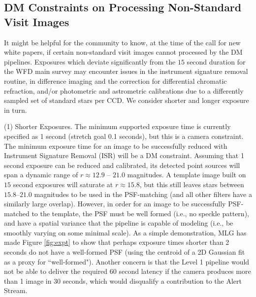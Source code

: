 \documentclass[DM,lsstdraft,toc]{lsstdoc}
\begin{document}
\subsection{DM Constraints on Processing Non-Standard Visit Images}\label{ssec:data_DMconstraints}

It might be helpful for the community to know, at the time of the call for new white papers, if certain non-standard visit images cannot processed by the DM pipelines. Exposures which deviate significantly from the $15$ second duration for the WFD main survey may encounter issues in the instrument signature removal routine, in difference imaging and the correction for differential chromatic refraction, and/or photometric and astrometric calibrations due to a differently sampled set of standard stars per CCD. We consider shorter and longer exposure in turn.

(1) Shorter Exposures. The minimum supported exposure time is currently specified as 1 second (stretch goal 0.1 seconds), but this is a camera constraint. The minimum exposure time for an image to be successfully reduced with Instrument Signature Removal (ISR) will be a DM constraint. Assuming that 1 second exposure can be reduced and calibrated, its detected point sources will span a dynamic range of $r \approx 12.9$ -- $21.0$ magnitudes. A template image built on $15$ second exposures will saturate at $r \approx 15.8$, but this still leaves stars between $15.8$--$21.0$ magnitudes to be used in the PSF-matching (and all other filters have a similarly large overlap). However, in order for an image to be successfully PSF-matched to the template, the PSF must be well formed (i.e., no speckle pattern), and have a spatial variance that the pipeline is capable of modeling (i.e., be smoothly varying on some minimal scale). As a simple demonstration, MLG has made Figure \ref{fig:expt} to show that perhaps exposure times shorter than 2 seconds do not have a well-formed PSF (using the centroid of a 2D Gaussian fit as a proxy for ``well-formed"). Another concern is that the Level 1 pipeline would not be able to deliver the required $60$ second latency if the camera produces more than 1 image in 30 seconds, which would disqualify a contribution to the Alert Stream.
\end{document}
